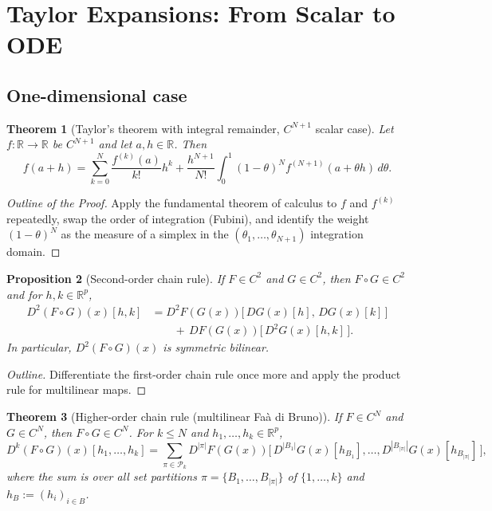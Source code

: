 \documentclass[12pt]{article}
\newtheorem{theorem}{Theorem}[section]
\newtheorem{proposition}[theorem]{Proposition}
\theoremstyle{remark}
\begin{document}
\section{Taylor Expansions: From Scalar to ODE}

\subsection{One-dimensional case}

\begin{theorem}[Taylor's theorem with integral remainder, $C^{N+1}$ scalar case]
Let $f:\mathbb{R} \to \mathbb{R}$ be $C^{N+1}$ and let $a,h \in \mathbb{R}$. Then
\[
f(a+h) = \sum_{k=0}^N \frac{f^{(k)}(a)}{k!} h^k 
+ \frac{h^{N+1}}{N!} \int_0^1 (1-\theta)^N f^{(N+1)}(a + \theta h)\,d\theta.
\]
\end{theorem}

\begin{proof}[Outline of the Proof]
Apply the fundamental theorem of calculus to $f$ and $f^{(k)}$ repeatedly, 
swap the order of integration (Fubini), and identify the weight $(1-\theta)^N$ 
as the measure of a simplex in the $(\theta_1,\dots,\theta_{N+1})$ integration domain.
\end{proof}

\medskip

\begin{proposition}[Second-order chain rule]
If $F\in C^2$ and $G\in C^2$, then $F\circ G\in C^2$ and for $h,k\in\mathbb{R}^p$,
\[
\begin{aligned}
D^2(F\circ G)(x)[h,k]
&= D^2F(G(x))\big[\,DG(x)[h],\,DG(x)[k]\,\big]
\\[-2pt]&\qquad +\, DF(G(x))\big[\,D^2G(x)[h,k]\,\big].
\end{aligned}
\]
In particular, $D^2(F\circ G)(x)$ is symmetric bilinear.
\end{proposition}

\begin{proof}[Outline]
Differentiate the first-order chain rule once more and apply the product rule for multilinear maps.
\end{proof}

\begin{theorem}[Higher-order chain rule (multilinear Fa\`a di Bruno)]
If $F\in C^{N}$ and $G\in C^{N}$, then $F\circ G\in C^{N}$. For $k\le N$ and $h_1,\dots,h_k\in\mathbb{R}^p$,
\[
D^{k}(F\circ G)(x)[h_1,\dots,h_k]
=\!\!\sum_{\pi\in \mathcal{P}_k}\!\!
D^{|\pi|}F(G(x))\Big[\, D^{|B_1|}G(x)[h_{B_1}],\dots, D^{|B_{|\pi|}|}G(x)[h_{B_{|\pi|}}]\,\Big],
\]
where the sum is over all set partitions $\pi=\{B_1,\dots,B_{|\pi|}\}$ of $\{1,\dots,k\}$ and
$h_{B}:=(h_i)_{i\in B}$.
\end{theorem}
\end{document}
